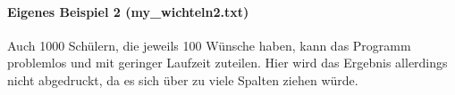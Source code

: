 \documentclass[a4paper,10pt,ngerman]{scrartcl}
\begin{document}
\paragraph{Eigenes Beispiel 2 (my\_wichteln2.txt)}
Auch 1000 Schülern, die jeweils 100 Wünsche haben, kann das Programm problemlos und mit geringer Laufzeit zuteilen.
Hier wird das Ergebnis allerdings nicht abgedruckt, da es sich über zu viele Spalten ziehen würde.
\end{document}
